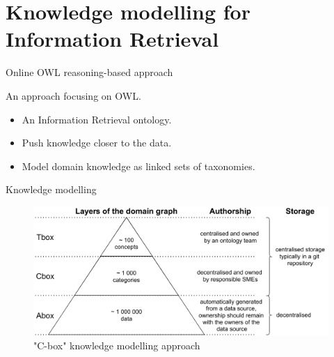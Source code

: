 \section{Knowledge modelling for Information Retrieval}

\begin{frame}{Online OWL reasoning-based approach}

    An approach focusing on OWL.
    
    \begin{itemize}
        \item An Information Retrieval ontology.
        \item Push knowledge closer to the data.
        \item Model domain knowledge as linked sets of taxonomies. 
    \end{itemize}

\end{frame}

\begin{frame}{Knowledge modelling}

    \begin{figure} [H]
        \begin{center}
            \includegraphics[scale=0.5]{images/TboxAboxCboxLayers.pdf} 
            \caption{"C-box" knowledge modelling approach} 
        \end{center}
    \end{figure}

\end{frame}

